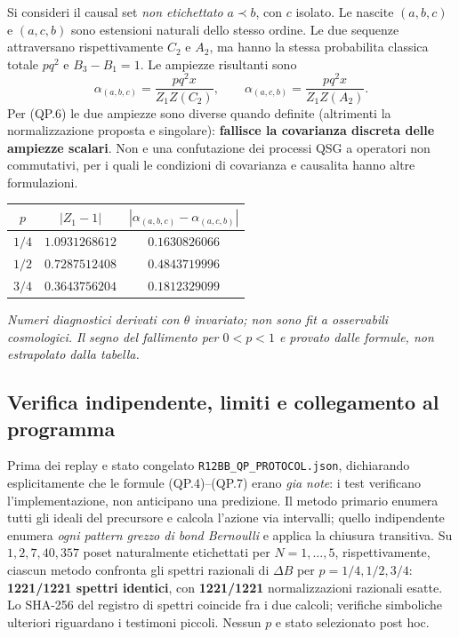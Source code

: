 \documentclass[11pt,a4paper]{article}
\begin{document}
Si consideri il causal set \emph{non etichettato} $a\prec b$, con $c$ isolato. Le nascite $(a,b,c)$ e $(a,c,b)$ sono estensioni naturali dello stesso ordine. Le due sequenze attraversano rispettivamente $C_2$ e $A_2$, ma hanno la stessa probabilita classica totale $pq^2$ e $B_3-B_1=1$. Le ampiezze risultanti sono
\begin{equation}
 \alpha_{(a,b,c)}=\frac{pq^2x}{Z_1 Z(C_2)},\qquad
 \alpha_{(a,c,b)}=\frac{pq^2x}{Z_1 Z(A_2)}.\tag{QP.7}
\end{equation}
Per (QP.6) le due ampiezze sono diverse quando definite (altrimenti la normalizzazione proposta e singolare): \textbf{fallisce la covarianza discreta delle ampiezze scalari}. Non e una confutazione dei processi QSG a operatori non commutativi, per i quali le condizioni di covarianza e causalita hanno altre formulazioni.

\begin{center}
\small
\begin{tabular}{ccc}
\toprule
$p$ & $|Z_1-1|$ & $|\alpha_{(a,b,c)}-\alpha_{(a,c,b)}|$\\
\midrule
$1/4$ & $1.0931268612$ & $0.1630826066$\\
$1/2$ & $0.7287512408$ & $0.4843719996$\\
$3/4$ & $0.3643756204$ & $0.1812329099$\\
\bottomrule
\end{tabular}
\end{center}
\textit{Numeri diagnostici derivati con $\theta$ invariato; non sono fit a osservabili cosmologici. Il segno del fallimento per $0<p<1$ e provato dalle formule, non estrapolato dalla tabella.}

\clearpage
\subsection*{Verifica indipendente, limiti e collegamento al programma}
Prima dei replay e stato congelato \texttt{R12BB\_QP\_PROTOCOL.json}, dichiarando esplicitamente che le formule (QP.4)--(QP.7) erano \emph{gia note}: i test verificano l'implementazione, non anticipano una predizione. Il metodo primario enumera tutti gli ideali del precursore e calcola l'azione via intervalli; quello indipendente enumera \emph{ogni pattern grezzo di bond Bernoulli} e applica la chiusura transitiva. Su $1,2,7,40,357$ poset naturalmente etichettati per $N=1,\ldots,5$, rispettivamente, ciascun metodo confronta gli spettri razionali di $\Delta B$ per $p=1/4,1/2,3/4$: \textbf{1221/1221 spettri identici}, con \textbf{1221/1221} normalizzazioni razionali esatte. Lo SHA-256 del registro di spettri coincide fra i due calcoli; verifiche simboliche ulteriori riguardano i testimoni piccoli. Nessun $p$ e stato selezionato post hoc.
\end{document}

